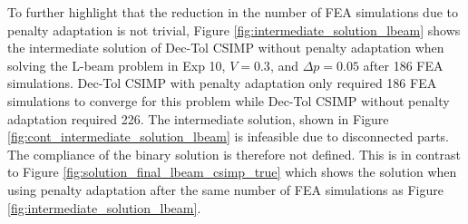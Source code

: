 
  To further highlight that the reduction in the number of FEA simulations due to penalty adaptation is not trivial, Figure \ref{fig:intermediate_solution_lbeam} shows the intermediate solution of Dec-Tol CSIMP without penalty adaptation when solving the L-beam problem in Exp 10, $V = 0.3$, and $\Delta p = 0.05$ after 186 FEA simulations. Dec-Tol CSIMP with penalty adaptation only required 186 FEA simulations to converge for this problem while Dec-Tol CSIMP without penalty adaptation required 226. The intermediate solution, shown in Figure \ref{fig:cont_intermediate_solution_lbeam} is infeasible due to disconnected parts. The compliance of the binary solution is therefore not defined. This is in contrast to Figure \ref{fig:solution_final_lbeam_csimp_true} which shows the solution when using penalty adaptation after the same number of FEA simulations as Figure \ref{fig:intermediate_solution_lbeam}.

